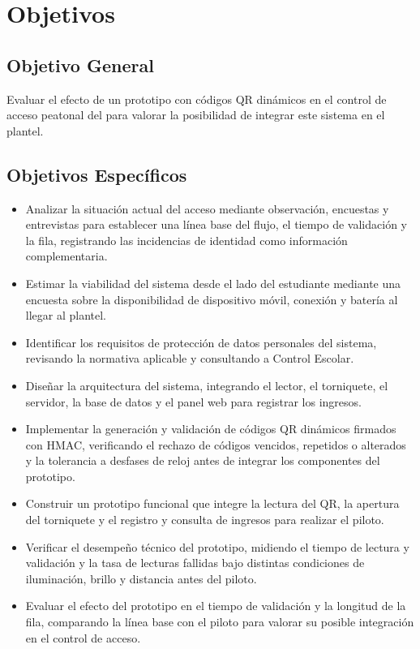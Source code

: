 \section{Objetivos}

\subsection{Objetivo General}
Evaluar el efecto de un prototipo con códigos QR dinámicos en el
control de acceso peatonal del \tescha{} para valorar la posibilidad de
integrar este sistema en el plantel.

\subsection{Objetivos Específicos}
\begin{itemize}
	\item Analizar la situación actual del acceso mediante observación,
	      encuestas y entrevistas para establecer una línea base del flujo,
	      el tiempo de validación y la fila, registrando las incidencias de
	      identidad como información complementaria.
	\item Estimar la viabilidad del sistema desde el lado del estudiante
	      mediante una encuesta sobre la disponibilidad de dispositivo móvil, conexión
	      y batería al llegar al plantel.
	\item Identificar los requisitos de protección de datos personales del
	      sistema, revisando la normativa aplicable y consultando a Control
	      Escolar.
	\item Diseñar la arquitectura del sistema, integrando el lector,
	      el torniquete, el servidor, la base de datos y el panel web para
	      registrar los ingresos.
	\item Implementar la generación y validación de códigos QR dinámicos
	      firmados con HMAC, verificando el rechazo de códigos
	      vencidos, repetidos o alterados y la tolerancia a desfases de reloj
	      antes de integrar los componentes del prototipo.
	\item Construir un prototipo funcional que integre la lectura del
	      QR, la apertura del torniquete y el registro y consulta de ingresos
	      para realizar el piloto.
	\item Verificar el desempeño técnico del prototipo, midiendo el
	      tiempo de lectura y validación y la tasa de lecturas fallidas bajo
	      distintas condiciones de iluminación, brillo y distancia antes
	      del piloto.
	\item Evaluar el efecto del prototipo en el tiempo de validación
	      y la longitud de la fila, comparando la línea base con el piloto
	      para valorar su posible integración en el control de acceso.
\end{itemize}

